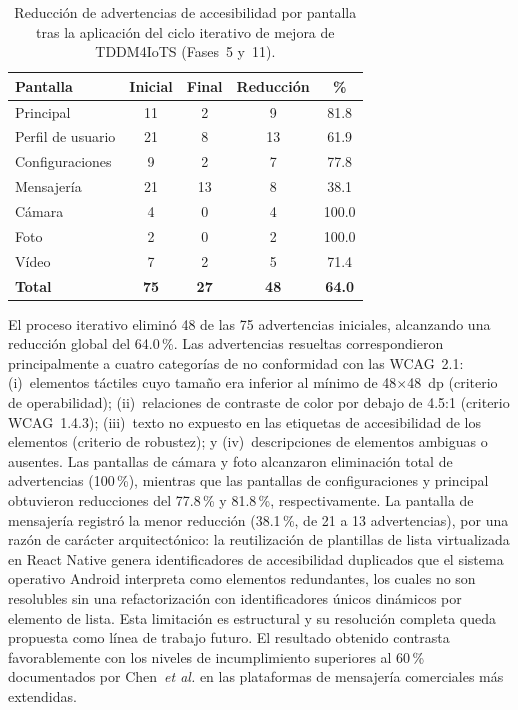 \documentclass[journal]{IEEEtran}
\begin{document}
			\begin{table}[!t]
				\caption{Reducci\'on de advertencias de accesibilidad por pantalla tras la aplicaci\'on del ciclo iterativo de mejora de TDDM4IoTS (Fases~5 y~11).}
				\label{tab:accesibilidad}
				\centering
				\small
				\renewcommand{\arraystretch}{1.25}
				\begin{tabular}{lcccc}
					\toprule
					\textbf{Pantalla} & \textbf{Inicial} & \textbf{Final} & \textbf{Reducci\'on} & \textbf{\%} \\
					\midrule
					Principal         & 11 & 2  & 9  & 81.8 \\
					Perfil de usuario & 21 & 8  & 13 & 61.9 \\
					Configuraciones   & 9  & 2  & 7  & 77.8 \\
					Mensajer\'ia      & 21 & 13 & 8  & 38.1 \\
					C\'amara          & 4  & 0  & 4  & 100.0 \\
					Foto              & 2  & 0  & 2  & 100.0 \\
					V\'ideo           & 7  & 2  & 5  & 71.4 \\
					\midrule
					\textbf{Total}    & \textbf{75} & \textbf{27} & \textbf{48} & \textbf{64.0} \\
					\bottomrule
				\end{tabular}
			\end{table}
			
			El proceso iterativo elimin\'o 48 de las 75 advertencias iniciales, alcanzando una reducci\'on global del 64.0\,\%. Las advertencias resueltas correspondieron principalmente a cuatro categor\'ias de no conformidad con las WCAG~2.1: (i)~elementos t\'actiles cuyo tama\~no era inferior al m\'inimo de 48$\times$48~dp (criterio de operabilidad); (ii)~relaciones de contraste de color por debajo de 4.5:1 (criterio WCAG~1.4.3); (iii)~texto no expuesto en las etiquetas de accesibilidad de los elementos (criterio de robustez); y (iv)~descripciones de elementos ambiguas o ausentes. Las pantallas de c\'amara y foto alcanzaron eliminaci\'on total de advertencias (100\,\%), mientras que las pantallas de configuraciones y principal obtuvieron reducciones del 77.8\,\% y 81.8\,\%, respectivamente. La pantalla de mensajer\'ia registr\'o la menor reducci\'on (38.1\,\%, de 21 a 13 advertencias), por una raz\'on de car\'acter arquitect\'onico: la reutilizaci\'on de plantillas de lista virtualizada en React Native genera identificadores de accesibilidad duplicados que el sistema operativo Android interpreta como elementos redundantes, los cuales no son resolubles sin una refactorizaci\'on con identificadores \'unicos din\'amicos por elemento de lista. Esta limitaci\'on es estructural y su resoluci\'on completa queda propuesta como l\'inea de trabajo futuro. El resultado obtenido contrasta favorablemente con los niveles de incumplimiento superiores al 60\,\% documentados por Chen~\textit{et al.} \cite{chen2022} en las plataformas de mensajer\'ia comerciales m\'as extendidas.
			
\end{document}
